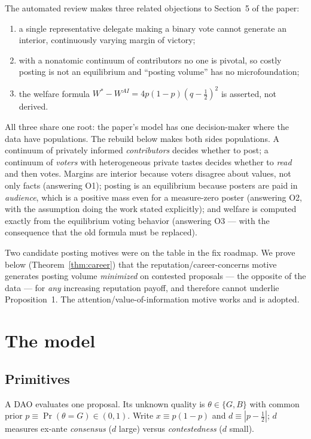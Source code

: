 \documentclass[11pt]{article}
\theoremstyle{remark}
\newcommand{\Pro}{\Pr}
\begin{document}
The automated review makes three related objections to Section~5 of the paper:
\begin{enumerate}[label=(O\arabic*),itemsep=1pt]
\item a single representative delegate making a binary vote cannot generate an
interior, continuously varying margin of victory;
\item with a nonatomic continuum of contributors no one is pivotal, so costly
posting is not an equilibrium and ``posting volume'' has no microfoundation;
\item the welfare formula $W^*-W^{AI}=4p(1-p)(q-\tfrac12)^2$ is asserted, not
derived.
\end{enumerate}
All three share one root: the paper's model has one decision-maker where the
data have populations. The rebuild below makes both sides populations. A
continuum of privately informed \emph{contributors} decides whether to post; a
continuum of \emph{voters} with heterogeneous private tastes decides whether to
\emph{read} and then votes. Margins are interior because voters disagree about
values, not only facts (answering O1); posting is an equilibrium because posters
are paid in \emph{audience}, which is a positive mass even for a measure-zero
poster (answering O2, with the assumption doing the work stated explicitly); and
welfare is computed exactly from the equilibrium voting behavior (answering O3
--- with the consequence that the old formula must be replaced).

Two candidate posting motives were on the table in the fix roadmap. We prove
below (Theorem~\ref{thm:career}) that the reputation/career-concerns motive
generates posting volume \emph{minimized} on contested proposals --- the opposite
of the data --- for \emph{any} increasing reputation payoff, and therefore cannot
underlie Proposition~1. The attention/value-of-information motive works and is
adopted.

\section{The model}
\label{sec:model}

\subsection{Primitives}

A DAO evaluates one proposal. Its unknown quality is $\theta\in\{G,B\}$ with
common prior $p\equiv\Pro(\theta=G)\in(0,1)$. Write $x\equiv p(1-p)$ and
$d\equiv|p-\tfrac12|$; $d$ measures ex-ante \emph{consensus} ($d$ large) versus
\emph{contestedness} ($d$ small).
\end{document}

